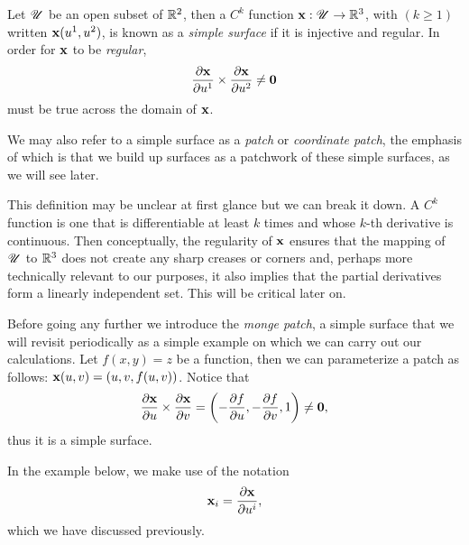   \begin{defn} %
    Let $\mathscr{U}$ be an open subset of $\mathbb{R}^2$, then a $C^k$ function $\mathbf{x}: \mathscr{U} \to \mathbb{R}^3$, with $(k \ge 1)$ written $\mathbf{x}(u^1, u^2)$, is known as a \emph{simple surface} if it is injective and regular. In order for $\mathbf{x}$ to be \emph{regular},
    \[
      \frac{\partial\mathbf{x}}{\partial u^1} \times \frac{\partial\mathbf{x}}{\partial u^2} \neq \mathbf{0}
    \]
    must be true across the domain of $\mathbf{x}$.

    We may also refer to a simple surface as a \emph{patch} or \emph{coordinate patch}, the emphasis of which is that we build up surfaces as a patchwork of these simple surfaces, as we will see later.
  \end{defn}

  This definition may be unclear at first glance but we can break it down. A $C^k$ function is one that is differentiable at least $k$ times and whose $k$-th derivative is continuous. Then conceptually, the regularity of $\mathbf{x}$ ensures that the mapping of $\mathscr{U}$ to $\mathbb{R}^3$ does not create any sharp creases or corners and, perhaps more technically relevant to our purposes, it also implies that the partial derivatives form a linearly independent set. This will be critical later on.

  \begin{ex} %
    \label{ex:monge}
    Before going any further we introduce the \emph{monge patch}, a simple surface that we will revisit periodically as a simple example on which we can carry out our calculations. Let $f(x, y) = z$ be a function, then we can parameterize a patch as follows: $\mathbf{x}(u, v) = (u, v, f(u, v))$. Notice that
    \begin{equation*}
      \frac{\partial\mathbf{x}}{\partial u} \times \frac{\partial\mathbf{x}}{\partial v} = \left(-\frac{\partial f}{\partial u}, -\frac{\partial f}{\partial v}, 1\right) \neq \mathbf{0},
    \end{equation*}
    thus it is a simple surface.
  \end{ex}

  In the example below, we make use of the notation
  \[
    \mathbf{x}_i = \frac{\partial\mathbf{x}}{\partial u^i},
  \]
  which we have discussed previously.

